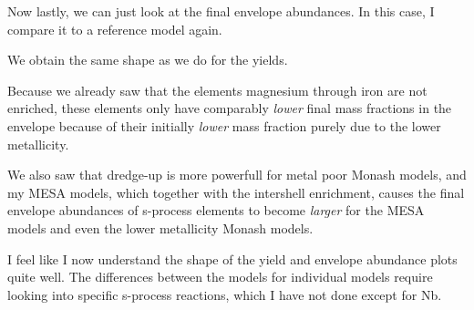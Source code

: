 \documentclass[a4paper,10pt]{article}
\begin{document}
Now lastly, we can just look at the final envelope abundances. In this case, I compare it to a reference
model again.

\begin{figure}[ht]
    \centering
\end{figure}

We obtain the same shape as we do for the yields. 

Because we already saw that the elements magnesium through iron are not enriched, these elements only
have comparably \emph{lower} final mass fractions in the envelope because of their initially \emph{lower} 
mass fraction purely due to the lower metallicity.

We also saw that dredge-up is more powerfull for metal poor Monash models, and my MESA models, which
together with the intershell enrichment, causes the final envelope abundances of s-process elements to
become \emph{larger} for the MESA models and even the lower metallicity Monash models.

I feel like I now understand the shape of the yield and envelope abundance plots quite well.
The differences between the models for individual models require looking into specific s-process
reactions, which I have not done except for Nb.


\begin{figure}[ht]
    \centering
\end{figure}

\begin{figure}[ht]
    \centering
\end{figure}

\begin{figure}[ht]
    \centering
\end{figure}



\end{document}
